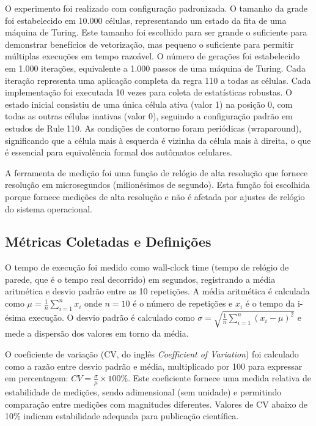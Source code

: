 \documentclass[12pt]{article}
\begin{document}
O experimento foi realizado com configuração padronizada. O tamanho da grade foi estabelecido em 10.000 células, representando um estado da fita de uma máquina de Turing. Este tamanho foi escolhido para ser grande o suficiente para demonstrar benefícios de vetorização, mas pequeno o suficiente para permitir múltiplas execuções em tempo razoável. O número de gerações foi estabelecido em 1.000 iterações, equivalente a 1.000 passos de uma máquina de Turing. Cada iteração representa uma aplicação completa da regra 110 a todas as células. Cada implementação foi executada 10 vezes para coleta de estatísticas robustas. O estado inicial consistiu de uma única célula ativa (valor 1) na posição 0, com todas as outras células inativas (valor 0), seguindo a configuração padrão em estudos de Rule 110. As condições de contorno foram periódicas (wraparound), significando que a célula mais à esquerda é vizinha da célula mais à direita, o que é essencial para equivalência formal dos autômatos celulares.

A ferramenta de medição foi uma função de relógio de alta resolução que fornece resolução em microsegundos (milionésimos de segundo). Esta função foi escolhida porque fornece medições de alta resolução e não é afetada por ajustes de relógio do sistema operacional.

\subsection{Métricas Coletadas e Definições}

O tempo de execução foi medido como wall-clock time (tempo de relógio de parede, que é o tempo real decorrido) em segundos, registrando a média aritmética e desvio padrão entre as 10 repetições. A média aritmética é calculada como $\mu = \frac{1}{n}\sum_{i=1}^{n} x_i$ onde $n=10$ é o número de repetições e $x_i$ é o tempo da i-ésima execução. O desvio padrão é calculado como $\sigma = \sqrt{\frac{1}{n}\sum_{i=1}^{n}(x_i - \mu)^2}$ e mede a dispersão dos valores em torno da média.

O coeficiente de variação (CV, do inglês \textit{Coefficient of Variation}) foi calculado como a razão entre desvio padrão e média, multiplicado por 100 para expressar em percentagem: $CV = \frac{\sigma}{\mu} \times 100\%$. Este coeficiente fornece uma medida relativa de estabilidade de medições, sendo adimensional (sem unidade) e permitindo comparação entre medições com magnitudes diferentes. Valores de CV abaixo de 10\% indicam estabilidade adequada para publicação científica.
\end{document}
